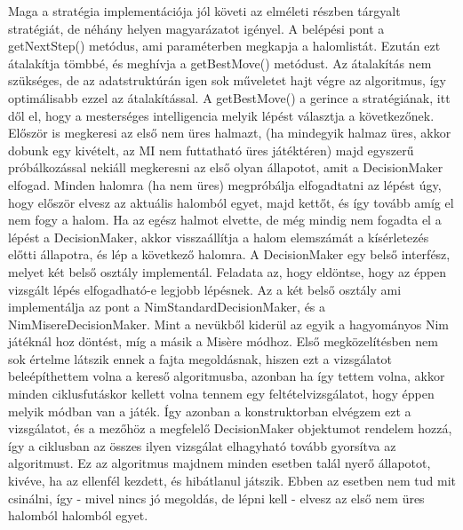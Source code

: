 Maga a stratégia implementációja jól követi az elméleti részben tárgyalt stratégiát, de néhány helyen magyarázatot igényel. \ujsor
A belépési pont a getNextStep() metódus, ami paraméterben megkapja a halomlistát. Ezután ezt átalakítja tömbbé, és meghívja a getBestMove() metódust. Az átalakítás nem szükséges, de az adatstruktúrán igen sok műveletet hajt végre az algoritmus, így optimálisabb ezzel az átalakítással.\ujsor
A getBestMove() a gerince a stratégiának, itt dől el, hogy a mesterséges intelligencia melyik lépést választja a következőnek. Először is megkeresi az első nem üres halmazt, (ha mindegyik halmaz üres, akkor dobunk egy kivételt, az MI nem futtatható üres játéktéren) majd egyszerű próbálkozással nekiáll megkeresni az első olyan állapotot, amit a DecisionMaker elfogad. Minden halomra (ha nem üres) megpróbálja elfogadtatni az lépést úgy, hogy először elvesz az aktuális halomból egyet, majd kettőt, és így tovább amíg el nem fogy a halom. Ha az egész halmot elvette, de még mindig nem fogadta el a lépést a DecisionMaker, akkor visszaállítja a halom elemszámát a kísérletezés előtti állapotra, és lép a következő halomra.\ujsor
A DecisionMaker egy belső interfész, melyet két belső osztály implementál. Feladata az, hogy eldöntse, hogy az éppen vizsgált lépés elfogadható-e legjobb lépésnek. Az a két belső osztály ami implementálja az pont a NimStandardDecisionMaker, és a NimMisereDecisionMaker. Mint a nevükből kiderül az egyik a hagyományos Nim játéknál hoz döntést, míg a másik a Misère módhoz. Első megközelítésben nem sok értelme látszik ennek a fajta megoldásnak, hiszen ezt a vizsgálatot beleépíthettem volna a kereső algoritmusba, azonban ha így tettem volna, akkor minden ciklusfutáskor kellett volna tennem egy feltételvizsgálatot, hogy éppen melyik módban van a játék. Így azonban a konstruktorban elvégzem ezt a vizsgálatot, és a mezőhöz a megfelelő DecisionMaker objektumot rendelem hozzá, így a ciklusban az összes ilyen vizsgálat elhagyható tovább gyorsítva az algoritmust.\ujsor
Ez az algoritmus majdnem minden esetben talál nyerő állapotot, kivéve, ha az ellenfél kezdett, és hibátlanul játszik. Ebben az esetben nem tud mit csinálni, így - mivel nincs jó megoldás, de lépni kell - elvesz az első nem üres halomból halomból egyet.



